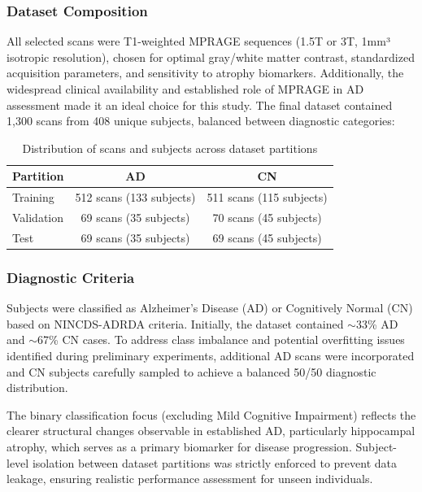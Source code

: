 \documentclass[11pt, a4paper]{article}
\begin{document}
\subsubsection{Dataset Composition}

All selected scans were T1-weighted MPRAGE sequences (1.5T or 3T, 1mm³ isotropic resolution), chosen for optimal gray/white matter contrast, standardized acquisition parameters, and sensitivity to atrophy biomarkers. Additionally, the widespread clinical availability and established role of MPRAGE in AD assessment made it an ideal choice for this study. The final dataset contained 1,300 scans from 408 unique subjects, balanced between diagnostic categories:

\begin{table}[htbp]
\centering
\begin{tabular}{|l|c|c|}
\hline
\textbf{Partition} & \textbf{AD} & \textbf{CN} \\
\hline
Training & 512 scans (133 subjects) & 511 scans (115 subjects) \\
Validation & 69 scans (35 subjects) & 70 scans (45 subjects) \\
Test & 69 scans (35 subjects) & 69 scans (45 subjects) \\
\hline
\end{tabular}
\caption{Distribution of scans and subjects across dataset partitions}
\end{table}

\subsubsection{Diagnostic Criteria}

Subjects were classified as Alzheimer's Disease (AD) or Cognitively Normal (CN) based on NINCDS-ADRDA criteria. Initially, the dataset contained $\sim$33\% AD and $\sim$67\% CN cases. To address class imbalance and potential overfitting issues identified during preliminary experiments, additional AD scans were incorporated and CN subjects carefully sampled to achieve a balanced 50/50 diagnostic distribution.

The binary classification focus (excluding Mild Cognitive Impairment) reflects the clearer structural changes observable in established AD, particularly hippocampal atrophy, which serves as a primary biomarker for disease progression. Subject-level isolation between dataset partitions was strictly enforced to prevent data leakage, ensuring realistic performance assessment for unseen individuals.
\end{document}
